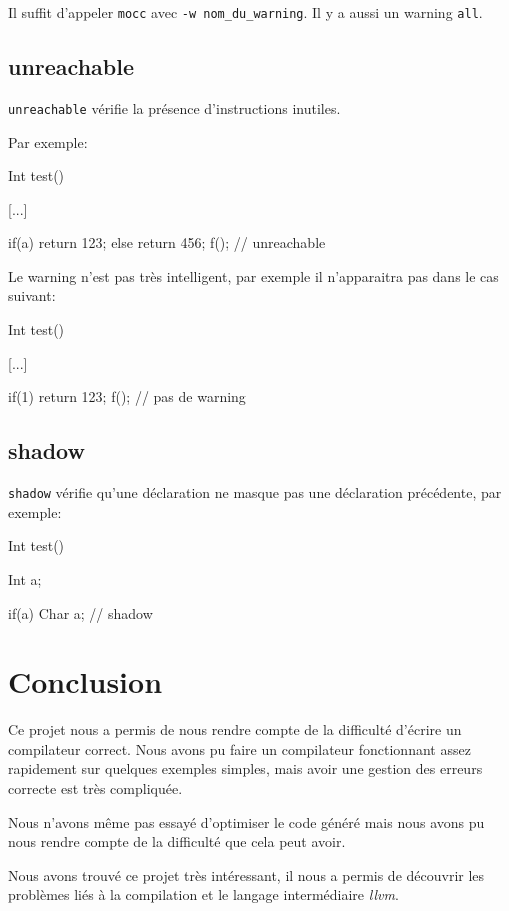 \documentclass{scrartcl}
\newcommand{\mocc}{\texttt{mocc}}
\newcommand{\llvm}{\textit{llvm}}
\begin{document}
  Il suffit d'appeler \mocc{} avec \verb+-w nom_du_warning+.
  Il y a aussi un warning \verb+all+.

  \subsection{unreachable}
    \verb"unreachable" vérifie la présence d'instructions inutiles.

    Par exemple:
    \begin{moccode}
Int test() {
    [...]

    if(a) {
        return 123;
    }
    else {
        return 456;
    }
    f(); // unreachable
}
    \end{moccode}

    Le warning n'est pas très intelligent, par exemple il n'apparaitra pas dans
    le cas suivant:
    \begin{moccode}
Int test() {
    [...]

    if(1) {
        return 123;
    }
    f(); // pas de warning
}
    \end{moccode}

  \subsection{shadow}
    \verb"shadow" vérifie qu'une déclaration ne masque pas une déclaration
    précédente, par exemple:
    \begin{moccode}
Int test() {
    Int a;

    if(a) {
        Char a; // shadow
    }
}
    \end{moccode}

\section{Conclusion}
  Ce projet nous a permis de nous rendre compte de la difficulté d'écrire un
  compilateur correct. Nous avons pu faire un compilateur fonctionnant assez
  rapidement sur quelques exemples simples, mais avoir une gestion des erreurs
  correcte est très compliquée.

  Nous n'avons même pas essayé d'optimiser le code généré mais nous avons pu
  nous rendre compte de la difficulté que cela peut avoir.

  Nous avons trouvé ce projet très intéressant, il nous a permis de découvrir
  les problèmes liés à la compilation et le langage intermédiaire \llvm{}.
\end{document}
